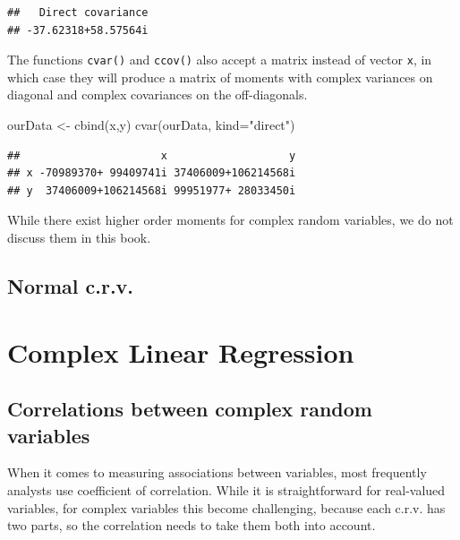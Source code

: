 \documentclass[
]{book}
\newenvironment{Shaded}{\begin{snugshade}}{\end{snugshade}}
\newcommand{\AttributeTok}[1]{\textcolor[rgb]{0.77,0.63,0.00}{#1}}
\newcommand{\FunctionTok}[1]{\textcolor[rgb]{0.00,0.00,0.00}{#1}}
\newcommand{\NormalTok}[1]{#1}
\newcommand{\OtherTok}[1]{\textcolor[rgb]{0.56,0.35,0.01}{#1}}
\newcommand{\StringTok}[1]{\textcolor[rgb]{0.31,0.60,0.02}{#1}}
\begin{document}
\begin{verbatim}
##   Direct covariance 
## -37.62318+58.57564i
\end{verbatim}

The functions \texttt{cvar()} and \texttt{ccov()} also accept a matrix instead of vector \texttt{x}, in which case they will produce a matrix of moments with complex variances on diagonal and complex covariances on the off-diagonals.

\begin{Shaded}
\begin{Highlighting}[]
\NormalTok{ourData }\OtherTok{\textless{}{-}} \FunctionTok{cbind}\NormalTok{(x,y)}
\FunctionTok{cvar}\NormalTok{(ourData, }\AttributeTok{kind=}\StringTok{"direct"}\NormalTok{)}
\end{Highlighting}
\end{Shaded}

\begin{verbatim}
##                      x                   y
## x -70989370+ 99409741i 37406009+106214568i
## y  37406009+106214568i 99951977+ 28033450i
\end{verbatim}

While there exist higher order moments for complex random variables, we do not discuss them in this book.

\hypertarget{normal-c.r.v.}{%
\section{Normal c.r.v.}\label{normal-c.r.v.}}

\hypertarget{CLR}{%
\chapter{Complex Linear Regression}\label{CLR}}

\hypertarget{correlations-between-complex-random-variables}{%
\section{Correlations between complex random variables}\label{correlations-between-complex-random-variables}}

When it comes to measuring associations between variables, most frequently analysts use coefficient of correlation. While it is straightforward for real-valued variables, for complex variables this become challenging, because each c.r.v. has two parts, so the correlation needs to take them both into account.
\end{document}
